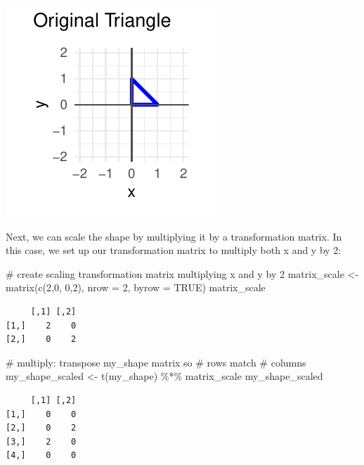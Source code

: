 \documentclass[
  letterpaper,
  DIV=11,
  numbers=noendperiod]{scrartcl}
\newenvironment{Shaded}{\begin{snugshade}}{\end{snugshade}}
\newcommand{\AttributeTok}[1]{\textcolor[rgb]{0.40,0.45,0.13}{#1}}
\newcommand{\CommentTok}[1]{\textcolor[rgb]{0.37,0.37,0.37}{#1}}
\newcommand{\ConstantTok}[1]{\textcolor[rgb]{0.56,0.35,0.01}{#1}}
\newcommand{\DecValTok}[1]{\textcolor[rgb]{0.68,0.00,0.00}{#1}}
\newcommand{\FunctionTok}[1]{\textcolor[rgb]{0.28,0.35,0.67}{#1}}
\newcommand{\NormalTok}[1]{\textcolor[rgb]{0.00,0.23,0.31}{#1}}
\newcommand{\OtherTok}[1]{\textcolor[rgb]{0.00,0.23,0.31}{#1}}
\newcommand{\SpecialCharTok}[1]{\textcolor[rgb]{0.37,0.37,0.37}{#1}}
\begin{document}
\includegraphics{Assignment-1---Fox_files/figure-pdf/create_shape-1.pdf}

Next, we can scale the shape by multiplying it by a transformation
matrix. In this case, we set up our transformation matrix to multiply
both x and y by 2:

\begin{Shaded}
\begin{Highlighting}[]
\CommentTok{\# create scaling transformation matrix multiplying x and y by 2 }
\NormalTok{matrix\_scale }\OtherTok{\textless{}{-}} \FunctionTok{matrix}\NormalTok{(}\FunctionTok{c}\NormalTok{(}\DecValTok{2}\NormalTok{,}\DecValTok{0}\NormalTok{,}
                         \DecValTok{0}\NormalTok{,}\DecValTok{2}\NormalTok{),}
                       \AttributeTok{nrow =} \DecValTok{2}\NormalTok{, }\AttributeTok{byrow =} \ConstantTok{TRUE}\NormalTok{)}
\NormalTok{matrix\_scale}
\end{Highlighting}
\end{Shaded}

\begin{verbatim}
     [,1] [,2]
[1,]    2    0
[2,]    0    2
\end{verbatim}

\begin{Shaded}
\begin{Highlighting}[]
\CommentTok{\# multiply: transpose my\_shape matrix so \# rows match \# columns }
\NormalTok{my\_shape\_scaled }\OtherTok{\textless{}{-}} \FunctionTok{t}\NormalTok{(my\_shape) }\SpecialCharTok{\%*\%}\NormalTok{ matrix\_scale }
\NormalTok{my\_shape\_scaled}
\end{Highlighting}
\end{Shaded}

\begin{verbatim}
     [,1] [,2]
[1,]    0    0
[2,]    0    2
[3,]    2    0
[4,]    0    0
\end{verbatim}
\end{document}
